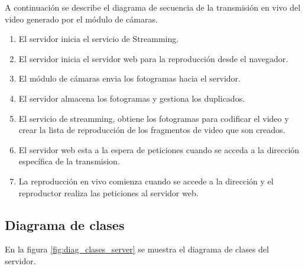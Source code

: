 A continuación se describe el diagrama de secuencia de la transmisión en vivo del video generado por el módulo de cámaras.

\begin{enumerate}
    \item El servidor inicia el servicio de Streamming.
    \item El servidor inicia el servidor web para la reproducción desde el navegador.
    \item El módulo de cámaras envia los fotogramas hacia el servidor.
    \item El servidor almacena los fotogramas y gestiona los duplicados.
    \item El servicio de streamming, obtiene los fotogramas para codificar el video y crear la lista de reproducción de los fragmentos de video que son creados.
    \item El servidor web esta a la espera de peticiones cuando se acceda a la dirección específica de la transmision.
    \item La reproducción en vivo comienza cuando se accede a la dirección y el reproductor realiza las peticiones al servidor web.
\end{enumerate}


\subsection{Diagrama de clases}
En la figura \ref{fig:diag_clases_server} se muestra el diagrama de clases del servidor.\\

